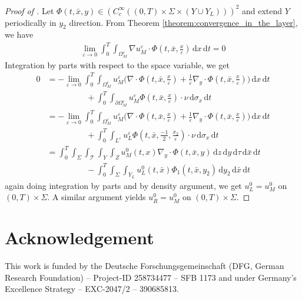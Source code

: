 \documentclass[11pt]{article}
\def\es{\varepsilon}
\def\omm{\Omega_M^\varepsilon}
\def\mint{\int_{0}^{T}\int_{\Sigma}\int_{\mathcal{T}}\int_{Y}\int_{Z}}
\newcommand{\di}[1]{\,\mathrm{d}#1}
\begin{document}
 \begin{proof}[Proof of ]
        Let $\Phi(t,\bar x,y)\in (C_c^\infty ((0,T)\times\Sigma\times (Y\cup Y_L)))^2$ and extend $Y$ periodically in $y_2$ direction. From Theorem \ref{theorem:convergence_in_the_layer}, we have
        \begin{align*}
           \lim_{\es\rightarrow 0} \int_0^T\int_{\omm}\nabla u_M^\es\cdot \Phi(t,\bar x,\tfrac{x}{\es})\di{x}\di{t}=0
        \end{align*}
        Integration by parts with respect to the space variable, we get
        \begin{align*}
            0&=-\lim_{\es\rightarrow 0} \int_0^T\int_{\omm}u_M^\es \Big(\nabla\cdot \Phi(t,\bar x,\tfrac{x}{\es})+\frac{1}{\es}\nabla_y \cdot\Phi(t,\bar x,\tfrac{x}{\es})\Big)\di{x}\di{t}\\
            &\hspace{2cm}+\int_0^T\int_{\partial\omm} u_M^\es\Phi(t,\bar x,\tfrac{x}{\es})\cdot\nu\di{\sigma_x}\di{t}\\
            &=-\lim_{\es\rightarrow 0} \int_0^T\int_{\omm}u_M^\es \Big(\nabla\cdot \Phi(t,\bar x,\tfrac{x}{\es})+\frac{1}{\es}\nabla_y \cdot\Phi(t,\bar x,\tfrac{x}{\es})\Big)\di{x}\di{t}\\
            &\hspace{2cm}+\int_0^T\int_{L^\es} u_L^\es\Phi(t,\bar x,\tfrac{-1}{2},\tfrac{x_2}{\es})\cdot\nu\di{\sigma_x}\di{t}\\
            &=\mint u_M^0(t,x)\nabla_y\cdot \Phi(t,\bar x,y)\di{z}\di{y}\di{\tau}\di{\bar x}\di{t}\\
            &\hspace{2cm}-\int_0^T\int_{\Sigma}\int_{Y_L}u_L^0(t,\bar x)\Phi_1(t,\bar x, y_2)\di{y_2}\di{\bar x}\di{t}
        \end{align*}
        again doing integration by parts and by density argument, we get $u_L^0=u_M^0$ on $(0,T)\times\Sigma.$ A similar argument yields $u_R^0=u_M^0$ on $(0,T)\times\Sigma.$
    \end{proof}
    \section*{Acknowledgement}
This work is funded by the Deutsche Forschungsgemeinschaft (DFG, German Research Foundation) – Project-ID 258734477 – SFB 1173 and under Germany's Excellence Strategy – EXC-2047/2 – 390685813.


	
 
 
 
 
 
 
 
 
 
 
 
\end{document}
